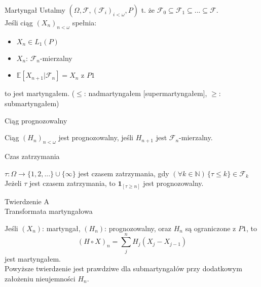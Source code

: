 \documentclass[avery5371,grid,frame]{flashcards}
\begin{document}
\begin{flashcard}[]{}
\end{flashcard}


\begin{flashcard}[Definicja]{Martyngał}
\smallskip
Ustalmy $ \left( \Omega, \mathcal{F}, \left( \mathcal{F}_i \right) _{i < \omega}, P \right) $ t. że $\mathcal{F}_0 \subseteq \mathcal{F}_1 \subseteq ... \subseteq \mathcal{F}$. \\
Jeśli ciąg $\left( X_n \right) _{n < \omega} $ spełnia:
\begin{itemize}
\item $ X_n \in L_1(P) $
\item $ X_n $: $ \mathcal{F}_n $-mierzalny
\item $ \mathbb{E} [ X_{n+1} | \mathcal{F}_n ] = X_n $ z $P1$
\end{itemize}
to jest martyngałem. ($ \leq $: nadmartyngałem [supermartyngałem], $ \geq $: submartyngałem)
\end{flashcard}

\begin{flashcard}[Definicja]{Ciąg prognozowalny}

\smallskip
Ciąg $ \left( H_n \right) _{n < \omega} $ jest prognozowalny, jeśli $H_{n+1}$ jest $\mathcal{F}_n$-mierzalny.
\end{flashcard}

\begin{flashcard}[Definicja]{Czas zatrzymania}

\smallskip
$\tau: \Omega \rightarrow \{1, 2, ...\} \cup \{ \infty \}$ jest czasem zatrzymania, gdy $(\forall k \in \mathbb{N}) \, \{ \tau \leq k \} \in \mathcal{F}_k$ \\
Jeżeli $\tau$ jest czasem zatrzymania, to $\mathbf{1}_{[\tau \geq n]}$ jest prognozowalny.
\end{flashcard}

\begin{flashcard}[Twierdzenie]{Twierdzenie A \\ Transformata martyngałowa}

\smallskip
Jeśli $(X_n)$: martyngał, $(H_n)$: prognozowalny, oraz $H_n$ są ograniczone z $P1$, to
$$ (H \circ X)_n = \sum ^n _j H_j (X_j - X_{j-1})  $$
jest martyngałem. \\
Powyższe twierdzenie jest prawdziwe dla submartyngałów przy dodatkowym założeniu nieujemności $H_n$.
\end{flashcard}
\end{document}
